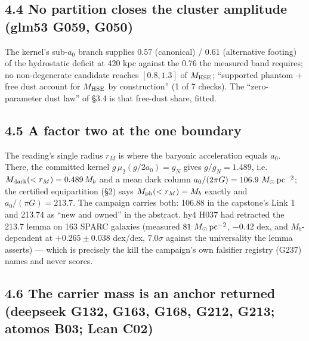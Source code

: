 \documentclass[
  11pt,
]{article}
\begin{document}
\subsection{4.4 No partition closes the cluster amplitude (glm53 G059,
G050)}\label{no-partition-closes-the-cluster-amplitude-glm53-g059-g050}

The kernel's sub-\(a_0\) branch supplies 0.57 (canonical) / 0.61
(alternative footing) of the hydrostatic deficit at 420 kpc against the
0.76 the measured band requires; no non-degenerate candidate reaches
\([0.8, 1.3]\) of \(M_{\rm HSE}\); ``supported phantom + free dust
account for \(M_{\rm HSE}\) by construction'' (1 of 7 checks). The
``zero-parameter dust law'' of §3.4 is that free-dust share, fitted.

\subsection{4.5 A factor two at the one
boundary}\label{a-factor-two-at-the-one-boundary}

The reading's single radius \(r_M\) is where the baryonic acceleration
equals \(a_0\). There, the committed kernel \(g\,\mu_2(g/2a_0) = g_N\)
gives \(g/g_N = 1.489\), i.e.~\(M_{\rm dark}(<r_M) = 0.489\,M_b\) and a
mean dark column \(a_0/(2\pi G) = 106.9\ M_\odot\,{\rm pc}^{-2}\); the
certified equipartition (§2) says \(M_{\rm ph}(<r_M) = M_b\) exactly and
\(a_0/(\pi G) = 213.7\). The campaign carries both: 106.88 in the
capstone's Link 1 and 213.74 as ``new and owned'' in the abstract. hy4
H037 had retracted the 213.7 lemma on 163 SPARC galaxies (measured
\(81\ M_\odot\,{\rm pc}^{-2}\), \(-0.42\) dex, and \(M_b\)-dependent at
\(+0.265 \pm 0.038\) dex/dex, \(7.0\sigma\) against the universality the
lemma asserts) --- which is precisely the kill the campaign's own
falsifier registry (G237) names and never scores.

\subsection{4.6 The carrier mass is an anchor returned (deepseek G132,
G163, G168, G212, G213; atomos B03; Lean
C02)}\label{the-carrier-mass-is-an-anchor-returned-deepseek-g132-g163-g168-g212-g213-atomos-b03-lean-c02}
\end{document}

